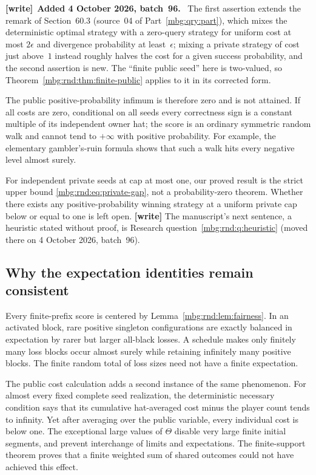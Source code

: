 \documentclass[11pt,letterpaper]{article}
\theoremstyle{definition}
\newenvironment{writenote}[1][]{\par\smallskip\begingroup\small
 \noindent\textbf{[write]}\if\relax\detokenize{#1}\relax\else~\textbf{#1.}\fi\ }%
 {\par\endgroup\smallskip}
\begin{document}
\begin{writenote}[Added 4 October 2026, batch~96]
The first assertion extends the remark of Section~60.3 (source~04 of Part~\ref{mbg:qry:part}), which mixes the deterministic optimal strategy with a zero-query strategy for uniform cost at most $2\epsilon$ and divergence probability at least~$\epsilon$; mixing a private strategy of cost just above~$1$ instead roughly halves the cost for a given success probability, and the second assertion is new. The ``finite public seed'' here is two-valued, so Theorem~\ref{mbg:rnd:thm:finite-public} applies to it in its corrected form.
\end{writenote}

The public positive-probability infimum is therefore zero and is not
attained. If all costs are zero, conditional on all seeds every
correctness sign is a constant multiple of its independent owner hat;
the score is an ordinary symmetric random walk and cannot tend to
$+\infty$ with positive probability. For example, the elementary
gambler's-ruin formula shows that such a walk hits every negative level
almost surely.

For independent private seeds at cap at most one, our proved result is
the strict upper bound \eqref{mbg:rnd:eq:private-gap}, not a probability-zero
theorem. Whether there exists any positive-probability winning strategy
at a uniform private cap below or equal to one is left open.
{\small\textbf{[write]} The manuscript's next sentence, a heuristic stated without proof, is Research question~\ref{mbg:rnd:q:heuristic} (moved there on 4 October 2026, batch~96).}

\subsection{Why the expectation identities remain consistent}

Every finite-prefix score is centered by Lemma~\ref{mbg:rnd:lem:fairness}. In an
activated block, rare positive singleton configurations are exactly
balanced in expectation by rarer but larger all-black losses. A
schedule makes only finitely many loss blocks occur almost surely
while retaining infinitely many positive blocks. The finite random
total of loss sizes need not have a finite expectation.

The public cost calculation adds a second instance of the same
phenomenon. For almost every fixed complete seed realization, the
deterministic necessary condition says that its cumulative
hat-averaged cost minus the player count tends to infinity. Yet after
averaging over the public variable, every individual cost is below one.
The exceptional large values of $\Theta$ disable very large finite initial
segments, and prevent interchange of limits and expectations. The
finite-support theorem proves that a finite weighted sum of shared
outcomes could not have achieved this effect.
\end{document}

